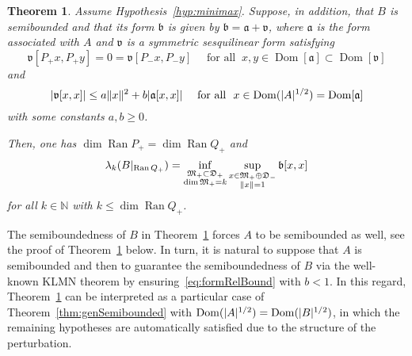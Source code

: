 \documentclass[11pt,a4paper]{amsart}
\numberwithin{equation}{section}
\DeclareMathOperator{\Ran}{Ran}
\DeclareMathOperator{\Dom}{Dom}
\DeclarePairedDelimiter{\abs}{|}{|}
\DeclarePairedDelimiter{\norm}{\lVert}{\rVert}
\newcommand{\NN}{\mathbb{N}}
\newcommand{\fa}{{\mathfrak a}}
\newcommand{\fb}{{\mathfrak b}}
\newcommand{\fv}{{\mathfrak v}}
\newcommand{\fD}{{\mathfrak D}}
\newcommand{\fM}{{\mathfrak M}}
\theoremstyle{plain}
\newtheorem{theorem}{Theorem}[section]
\theoremstyle{definition}
\theoremstyle{remark}
\begin{document}
\begin{theorem}\label{thm:offdiagForm}
  Assume Hypothesis~\ref{hyp:minimax}. Suppose, in addition, that $B$ is semibounded and that its form $\fb$ is given by
  $\fb = \fa + \fv$, where $\fa$ is the form associated with $A$ and $\fv$ is a symmetric sesquilinear form satisfying
  \begin{equation*}
    \fv[ P_+x , P_+y ]
    =
    0
    =
    \fv[ P_-x , P_-y ]
    \quad\text{ for all }\
    x,y \in \Dom[\fa] \subset \Dom[\fv]
  \end{equation*}
  and
  \begin{equation}\label{eq:formRelBound}
    \abs{ \fv[ x , x ] }
    \le
    a\norm{x}^2 + b\abs{\fa[ x , x ]}
    \quad\text{ for all }\
    x \in \Dom(\abs{A}^{1/2}) = \Dom[\fa]
  \end{equation}
  with some constants $a,b \ge 0$.

  Then, one has $\dim\Ran P_+ = \dim\Ran Q_+$ and
  \begin{equation*}
    \lambda_k(B|_{\Ran Q_+})
    =
    \inf_{\substack{\fM_+\subset\fD_+\\ \dim\fM_+=k}} \sup_{\substack{x\in\fM_+ \oplus \fD_-\\ \norm{x}=1}} \fb[x,x]
  \end{equation*}
  for all $k \in \NN$ with $k \le \dim\Ran Q_+$.
\end{theorem}

The semiboundedness of $B$ in Theorem~\ref{thm:offdiagForm} forces $A$ to be semibounded as well, see the proof of
Theorem~\ref{thm:offdiagForm} below. In turn, it is natural to suppose that $A$ is semibounded and then to guarantee the
semiboundedness of $B$ via the well-known KLMN theorem by ensuring~\eqref{eq:formRelBound} with $b < 1$. In this regard,
Theorem~\ref{thm:offdiagForm} can be interpreted as a particular case of Theorem~\ref{thm:genSemibounded} with
$\Dom(\abs{A}^{1/2}) = \Dom(\abs{B}^{1/2})$, in which the remaining hypotheses are automatically satisfied due to the structure
of the perturbation. 
\end{document}
